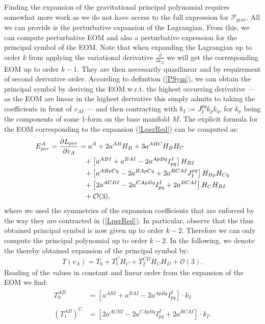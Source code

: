 Finding the expansion of the gravitational principal polynomial requires somewhat more work as we do not have access to the full expression for $\mathcal{P}_{\text{grav}}$. All we can provide is the perturbative expansion of the Lagrangian. From this, we can compute perturbative EOM and also a perturbative expression for the principal symbol of the EOM.
Note that when expanding the Lagrangian up to order $k$ from applying the variational derivative $\frac{\partial}{\partial v_A}$ we will get the corresponding EOM up to order $k-1$. They are then necessarily quasilinear and by requirement of second derivative order. According to definition (\ref{PSym}), we can obtain the principal symbol by deriving the EOM w.r.t. the highest occurring derivative  --- as the EOM are linear in the highest derivative this simply admits to taking the coefficients in front of $v_{AI}$ --- and then contracting with $k_I :=J_I^{pq} k_pk_q$, for $k_p$ being the components of some 1-form on the base manifold $M$. 
The explicit formula for the EOM corresponding to the expansion (\ref{LperRed}) can be computed as:
\begin{align}\label{EOMPert}
    \begin{aligned}
    E_{per}^A = \frac{\partial L_{per}}{\partial v_A} &= a^A + 2 a^{AB}H_B + 3a^{ABC}H_B H_C \\
    &\hphantom{=}+ \left [a^{ABI} + a^{BAI} - 2 a^{ApBq}I_{pq}^I  \right ] H_{BI} \\
    &\hphantom{=}+ \left[a^{ABpCq} -2a^{BApCq} +2a^{BCAI} J_I^{pq} \right]H_{Bp}H_{Cq} \\
    &\hphantom{=}+ \left [2a^{ACBI} -2a^{CApBq}I_{pq}^I + 2a^{BCAI} \right ]H_C H_{BI} \\
    &\hphantom{=}+ \mathcal{O}(3),
    \end{aligned}
\end{align}
where we used the symmetries of the expansion coefficients that are enforced by the way they are contracted in (\ref{LperRed}).
In particular, observe that the thus obtained principal symbol is now given up to order $k-2$. Therefore we can only compute the principal polynomial up to order $k-2$. In the following, we denote the thereby obtained expansion of the principal symbol by: 
\begin{align}
    T(v_A) = T_0 + T_1^CH_C + T_2^{CD}H_CH_D + \mathcal{O}(3).
\end{align}
Reading of the values in constant and linear order from the expansion of the EOM we find:
\begin{align}
    \begin{aligned}
    T_0^{AB} &= \left [a^{ABI} + a^{BAI} - 2 a^{ApBq}I_{pq}^I  \right ] \cdot k_I\\
    \\
    (T_1^{AB})^C &= \left [2a^{ACBI} -2a^{CApBq}I_{pq}^I + 2a^{BCAI} \right ] \cdot k_I. 
    \end{aligned}
\end{align}
